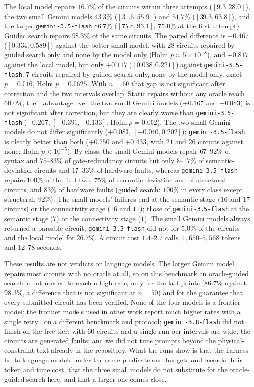 \documentclass[journal]{IEEEtran}
\begin{document}
The local model repairs $16.7\%$ of the circuits within three attempts ($[9.3,28.0]$), the two
small Gemini models $43.3\%$ ($[31.6,55.9]$) and $51.7\%$ ($[39.3,63.8]$), and the larger
\texttt{gemini-3.5-flash} $86.7\%$ ($[75.8,93.1]$; $75.0\%$ at the first attempt). Guided search repairs
$98.3\%$ of the same circuits. The paired difference is $+0.467$ ($[0.334,0.589]$) against the
better small model, with 28 circuits repaired by guided search only and none by the model only
(Holm $p\approx5\times10^{-8}$), and $+0.817$ against the local model, but only $+0.117$ ($[0.038,0.221]$)
against \texttt{gemini-3.5-flash}: 7 circuits repaired by guided search only, none by the model only, exact
$p=0.016$, Holm $p=0.0625$. With $n=60$ that gap is not significant after correction and the two intervals
overlap. Static repairs without any oracle reach $60.0\%$; their advantage over the two small Gemini models
($+0.167$ and $+0.083$) is not significant after correction, but they are clearly worse than
\texttt{gemini-3.5-flash} ($-0.267$, $[-0.391,-0.133]$; Holm $p=0.002$). The two small Gemini models do not
differ significantly ($+0.083$, $[-0.040,0.202]$); \texttt{gemini-3.5-flash} is clearly better than both
($+0.350$ and $+0.433$, with $21$ and $26$ circuits against none; Holm $p<10^{-5}$). By class, the small Gemini
models repair $67$--$92\%$ of syntax and $75$--$83\%$ of gate-redundancy circuits but only $8$--$17\%$ of
semantic-deviation circuits and $17$--$33\%$ of hardware faults, whereas \texttt{gemini-3.5-flash} repairs
$100\%$ of the first two, $75\%$ of semantic-deviation and of structural circuits, and $83\%$ of hardware faults
(guided search: $100\%$ in every class except structural, $92\%$). The small models' failures end at the
semantic stage ($16$ and $17$ circuits) or the connectivity stage ($16$ and $11$); those of
\texttt{gemini-3.5-flash} at the semantic stage ($7$) or the connectivity stage ($1$). The small Gemini models
always returned a parsable circuit, \texttt{gemini-3.5-flash} did not for $5.0\%$ of the circuits and the local
model for $26.7\%$. A circuit cost $1.4$--$2.7$ calls, $1{,}650$--$5{,}568$ tokens and $12$--$78$ seconds.

These results are not verdicts on language models. The larger Gemini model repairs most circuits with no oracle at all,
so on this benchmark an oracle-guided search is not needed to reach a high rate, only for the last points ($86.7\%$ against
$98.3\%$, a difference that is not significant at $n=60$) and for the guarantee that every submitted circuit has been verified.
None of the four models is a frontier model; the frontier models used in other work report much higher rates with a single
retry~\cite{pham2026qbuglm} on a different benchmark and protocol; \texttt{gemini-3.8-flash} did not finish on the free
tier; with 60 circuits and a single run our intervals are wide; the circuits are generated faults; and we did not tune prompts
beyond the physical-constraint text already in the repository. What the runs show is that the harness hosts language models
under the same predicate and budgets and records their token and time cost, that the three small models do not substitute
for the oracle-guided search here, and that a larger one comes close.
\end{document}
